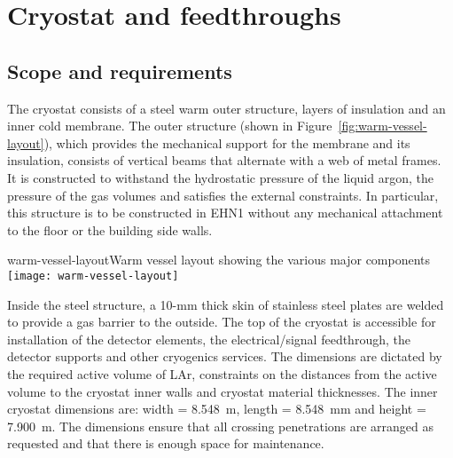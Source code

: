 
\section{Cryostat and feedthroughs}

\subsection{Scope and requirements}

The cryostat consists of a steel warm outer structure, layers of insulation and an inner cold membrane.  The outer %
structure (shown in Figure~\ref{fig:warm-vessel-layout}), which provides %
the mechanical support for the  %
membrane and its insulation,  consists of vertical beams that alternate with a web of metal frames. It is constructed to %
withstand the hydrostatic pressure of the liquid argon, the pressure of the gas volumes and %
satisfies the external constraints. %
In particular, this structure is to be constructed in EHN1 without any mechanical attachment to the floor or the building side walls.  
%
\begin{cdrfigure}{warm-vessel-layout}{Warm vessel layout showing the various major components}
  \texttt{[image: warm-vessel-layout]}
\end{cdrfigure}
Inside the steel structure, a 10-mm thick skin of stainless steel plates are welded to provide a gas barrier to the outside.
The top of the cryostat is accessible for installation of the detector elements, the electrical/signal feedthrough, the detector supports and other cryogenics services.  The dimensions %
are dictated by the required %
active volume of LAr, constraints on the distances from the active volume to the cryostat inner walls and cryostat material thicknesses.  %
The inner cryostat dimensions are: width = 8.548~m, length = 8.548~mm and height = 7.900~m. The dimensions 
ensure that all crossing penetrations are arranged as requested and that there is enough space for maintenance. 


